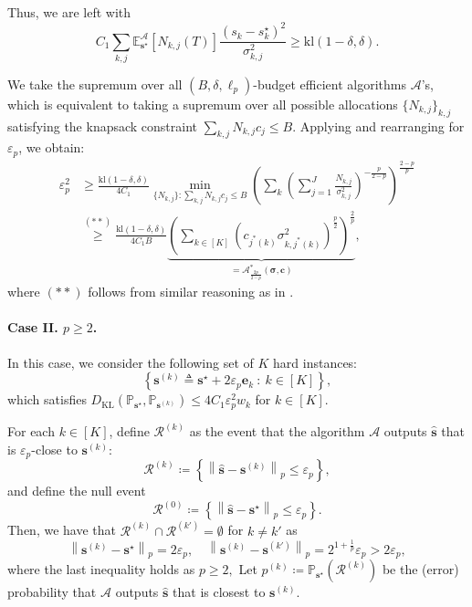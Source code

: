 \documentclass{article}
\def\vc{{\bm{c}}}
\def\ve{{\bm{e}}}
\def\vs{{\bm{s}}}
\def\gA{{\mathcal{A}}}
\def\gR{{\mathcal{R}}}
\def\sP{{\mathbb{P}}}
\newcommand{\E}{\mathbb{E}}
\newcommand{\KL}{D_{\mathrm{KL}}}
\newcommand{\kl}{\mathrm{kl}}
\theoremstyle{plain}
\theoremstyle{definition}
\theoremstyle{plain}
\newcommand{\bignorm}[1]{\left\lVert #1 \right\rVert}
\begin{document}
Thus, we are left with
\begin{equation}
    C_1 \sum_{k, j} \E^\gA_{\vs^\star}[N_{k,j}(T)] \frac{(s_k - s_k^\star)^2}{\sigma_{k,j}^2} \geq \kl\left( 1 - \delta, \delta \right).
\end{equation}

We take the supremum over all $(B, \delta, \ell_p)$-budget efficient algorithms $\gA$'s, which is equivalent to taking a supremum over all possible allocations $\{N_{k,j}\}_{k,j}$ satisfying the knapsack constraint $\sum_{k,j} N_{k,j} c_j \leq B.$
Applying  and rearranging for $\varepsilon_p$, we obtain:
\begin{align}
    \varepsilon_p^2 & \ge \frac{\kl(1-\delta, \delta)}{4 C_1} \min_{\{N_{k,j}\}: \sum_{k,j} N_{k,j} c_{j} \le B} \left( \sum_k \left( \sum_{j = 1}^J \frac{N_{k,j}}{\sigma_{k,j}^2} \right)^{-\frac{p}{2-p}} \right)^{\frac{2-p}{p}} \\
    &\overset{(**)}{\ge} \frac{\kl(1-\delta, \delta)}{4 C_1 B} \underbrace{\left( \sum_{k\in[K]}\left( c_{j^*(k)} \sigma_{k,j^*(k)}^2 \right)^{\frac{p}{2}}\right)^{\frac{2}{p}}}_{= \gA_{\frac{2p}{2-p}}^*(\bm\sigma, \vc)},
\end{align}
where $(**)$ follows from similar reasoning as in .


\paragraph{Case II. $p \geq 2$.}
In this case, we consider the following set of $K$ hard instances:
\begin{equation}
    \left\{ \vs^{(k)} \triangleq \vs^\star + 2 \varepsilon_p \ve_k \ : \ k \in [K] \right\},
\end{equation}
which satisfies $\KL( \sP_{\vs^\star}, \sP_{\vs^{(k)}}) \leq 4 C_1 \varepsilon_p^2 w_k$ for $k \in [K]$.

For each $k \in [K]$, define $\gR^{(k)}$ as the event that the algorithm $\gA$ outputs $\hat{\vs}$ that is $\varepsilon_p$-close to $\vs^{(k)}$:
\begin{equation}
    \gR^{(k)} \coloneq \left\{ \bignorm{\hat{\vs} - \vs^{(k)}}_p \leq \varepsilon_p \right\},
\end{equation}
and define the null event
\begin{equation}
    \gR^{(0)} \coloneq \left\{ \bignorm{\hat{\vs} - \vs^\star}_p \leq \varepsilon_p \right\}.
\end{equation}
Then, we have that $\gR^{(k)} \cap \gR^{(k')} = \emptyset$ for $k \neq k'$ as
\begin{equation}
    \bignorm{\vs^{(k)} - \vs^\star}_p = 2\varepsilon_p, \quad
    \bignorm{\vs^{(k)} - \vs^{(k')}}_p = 2^{1 + \frac{1}{p}} \varepsilon_p > 2 \varepsilon_p,
\end{equation}
where the last inequality holds as $p \geq 2,$
Let $p^{(k)} \coloneq \sP_{\vs^\star}(\gR^{(k)})$ be the (error) probability that $\gA$ outputs $\hat{\vs}$ that is closest to $\vs^{(k)}$.
\end{document}
